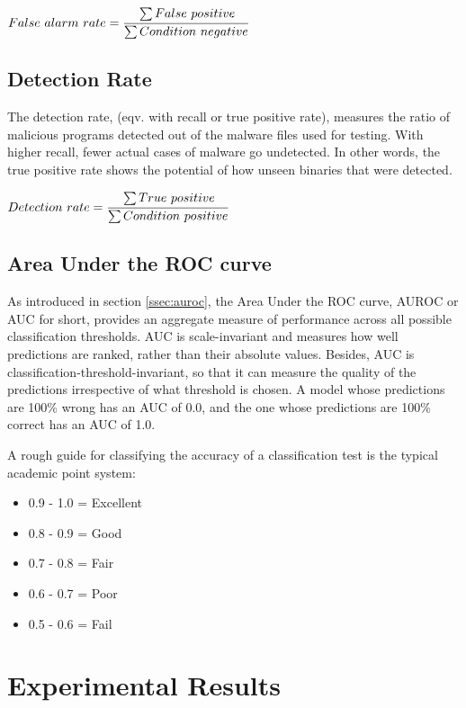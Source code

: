 \begin{center}
    ${False\ alarm\ rate} =  \cfrac{\sum False\ positive}{\sum Condition\ negative}$
\end{center}

\subsection{Detection Rate}

The detection rate, (eqv. with recall or true positive rate), measures the ratio of malicious programs detected out of the malware files used for testing. With higher recall, fewer actual cases of malware go undetected. In other words, the true positive rate shows the potential of how unseen binaries that were detected.

\begin{center}
    ${Detection\ rate} =  \cfrac{\sum True\ positive}{\sum Condition\ positive}$
\end{center}

\subsection{Area Under the ROC curve}

As introduced in section \ref{ssec:auroc}, the Area Under the ROC curve, AUROC or AUC for short, provides an aggregate measure of performance across all possible classification thresholds. AUC is scale-invariant and measures how well predictions are ranked, rather than their absolute values. Besides, AUC is classification-threshold-invariant, so that it can measure the quality of the predictions irrespective of what threshold is chosen. A model whose predictions are 100\% wrong has an AUC of 0.0, and the one whose predictions are 100\% correct has an AUC of 1.0.

A rough guide for classifying the accuracy of a classification test is the typical academic point system: 

\begin{itemize}
\item 0.9 - 1.0 = Excellent
\item 0.8 - 0.9 = Good
\item 0.7 - 0.8 = Fair
\item 0.6 - 0.7 = Poor
\item 0.5 - 0.6 = Fail
\end{itemize}

\section{Experimental Results}

